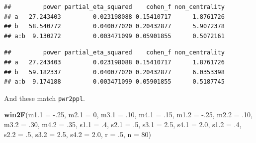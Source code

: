 \documentclass[]{book}
\newenvironment{Shaded}{\begin{snugshade}}{\end{snugshade}}
\newcommand{\DataTypeTok}[1]{\textcolor[rgb]{0.13,0.29,0.53}{#1}}
\newcommand{\DecValTok}[1]{\textcolor[rgb]{0.00,0.00,0.81}{#1}}
\newcommand{\FloatTok}[1]{\textcolor[rgb]{0.00,0.00,0.81}{#1}}
\newcommand{\KeywordTok}[1]{\textcolor[rgb]{0.13,0.29,0.53}{\textbf{#1}}}
\newcommand{\NormalTok}[1]{#1}
\newcommand{\OperatorTok}[1]{\textcolor[rgb]{0.81,0.36,0.00}{\textbf{#1}}}
\newcommand{\OtherTok}[1]{\textcolor[rgb]{0.56,0.35,0.01}{#1}}
\newcommand{\StringTok}[1]{\textcolor[rgb]{0.31,0.60,0.02}{#1}}
\begin{document}
\begin{verbatim}
##         power partial_eta_squared    cohen_f non_centrality
## a   27.243403         0.023198088 0.15410717      1.8761726
## b   58.540772         0.040077020 0.20432877      5.9072378
## a:b  9.130272         0.003471099 0.05901855      0.5072161
\end{verbatim}

\begin{Shaded}
\end{Shaded}

\begin{verbatim}
##         power partial_eta_squared    cohen_f non_centrality
## a   27.243403         0.023198088 0.15410717      1.8761726
## b   59.182337         0.040077020 0.20432877      6.0353398
## a:b  9.174188         0.003471099 0.05901855      0.5187745
\end{verbatim}

And these match \texttt{pwr2ppl}.

\begin{Shaded}
\begin{Highlighting}[]
\KeywordTok{win2F}\NormalTok{(}\DataTypeTok{m1.1 =} \FloatTok{-.25}\NormalTok{, }\DataTypeTok{m2.1 =} \DecValTok{0}\NormalTok{,}
      \DataTypeTok{m3.1 =} \FloatTok{.10}\NormalTok{, }\DataTypeTok{m4.1 =} \FloatTok{.15}\NormalTok{,}
      \DataTypeTok{m1.2 =} \FloatTok{-.25}\NormalTok{, }\DataTypeTok{m2.2 =} \FloatTok{.10}\NormalTok{,}
      \DataTypeTok{m3.2 =} \FloatTok{.30}\NormalTok{, }\DataTypeTok{m4.2 =} \FloatTok{.35}\NormalTok{,}
      \DataTypeTok{s1.1 =} \FloatTok{.4}\NormalTok{, }\DataTypeTok{s2.1 =} \FloatTok{.5}\NormalTok{,}
      \DataTypeTok{s3.1 =} \FloatTok{2.5}\NormalTok{, }\DataTypeTok{s4.1 =} \FloatTok{2.0}\NormalTok{,}
      \DataTypeTok{s1.2 =} \FloatTok{.4}\NormalTok{, }\DataTypeTok{s2.2 =} \FloatTok{.5}\NormalTok{,}
      \DataTypeTok{s3.2 =} \FloatTok{2.5}\NormalTok{, }\DataTypeTok{s4.2 =} \FloatTok{2.0}\NormalTok{,}
      \DataTypeTok{r =} \FloatTok{.5}\NormalTok{, }\DataTypeTok{n =} \DecValTok{80}\NormalTok{)}
\end{Highlighting}
\end{Shaded}
\end{document}
